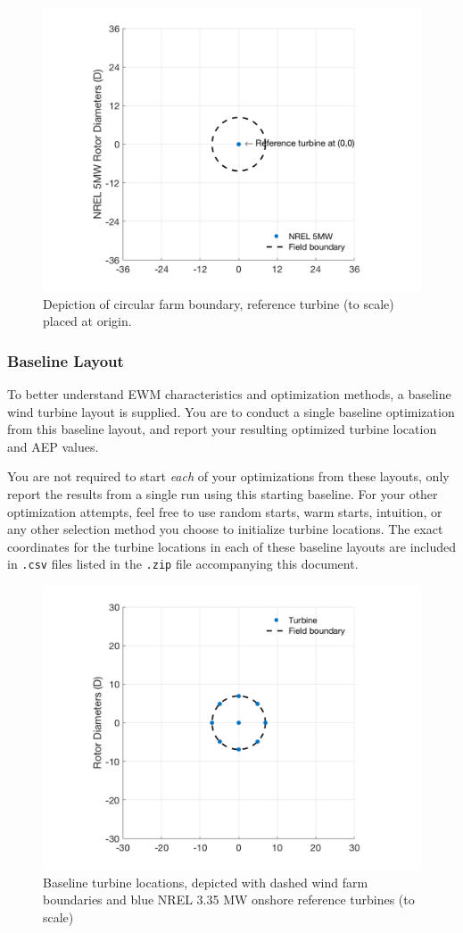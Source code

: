 \documentclass[12pt]{article}
\begin{document}
    \begin{figure}[H]
        \centering
        \includegraphics[width=.65\linewidth]{EmptyCmbndFarm.png}
        \caption{Depiction of circular farm boundary, reference turbine (to scale) placed at origin.}
        \label{fig:EmptyCmbndFarm}
    \end{figure}

    \subsubsection{Baseline Layout}
    To better understand EWM characteristics and optimization methods, a baseline wind turbine layout is supplied. You are to conduct a single baseline optimization from this baseline layout, and report your resulting optimized turbine location and AEP values.
    
    You are not required to start \textit{each} of your optimizations from these layouts, only report the results from a single run using this starting baseline. For your other optimization attempts, feel free to use random starts, warm starts, intuition, or any other selection method you choose to initialize turbine locations. The exact coordinates for the turbine locations in each of these baseline layouts are included in \texttt{.csv} files listed in the \texttt{.zip} file accompanying this document.
    
    \begin{figure}[H]
        \centering
        \includegraphics[width=.65\linewidth]{BaselineCmbndFarm.png}
        \caption{Baseline turbine locations, depicted with dashed wind farm boundaries and blue NREL 3.35 MW onshore reference turbines (to scale)} \label{fig:BaseLoc}
    \end{figure}
\end{document}
